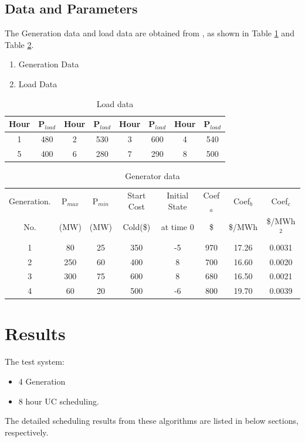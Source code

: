 \documentclass[a4paper, 12pt, notitlepage]{report}
\begin{document}
\section{Data and Parameters}
The Generation data and load data are obtained from \cite{4}, as shown in Table \ref{table:table1} and Table \ref{table:table2}.
\begin{enumerate}
\item[1)]Generation Data
\item[2)]Load Data
\end{enumerate}

\begin{table}
\centering
\begin{tabular}{ | c | c || c | c || c | c || c | c |}
\hline
Hour & P$_{load}$ & Hour & P$_{load}$  & Hour & P$_{load}$ & Hour & P$_{load}$\\
\hline
1 & 480  & 2 & 530 & 3 & 600 & 4 & 540\\
\hline
5 & 400  & 6 & 280 & 7 & 290 & 8 & 500\\
\hline
\end{tabular}
\caption{Load data}
\label{table:table1}
\end{table}

\begin{table}
\centering
\begin{tabular}{|c|c|c|c|c|c|c|c|}
\hline
Generation. & P$_{max}$ & P$_{min}$ & Start Cost & Initial State & Coef$_{a}$ & Coef$_{b}$  &  Coef$_{c}$  \\
No.         & (MW)    & (MW)       & Cold(\$)  & at time 0     &     \$     &  \$/MWh  & \$/MWh$^{2}$ \\
\hline
1 & 80  & 25 & 350 & -5 & 970 & 17.26 & 0.0031\\
\hline
2 & 250 & 60 & 400 & 8  & 700 & 16.60 & 0.0020\\
\hline
3 & 300 & 75 & 600 & 8  & 680 & 16.50 & 0.0021\\
\hline
4 & 60  & 20 & 500 & -6 & 800 & 19.70 & 0.0039\\
\hline
\end{tabular}
\caption{Generator data}
\label{table:table2}
\end{table}

\chapter{Results}
The test system:
\begin{itemize}
  \item 4 Generation
  \item 8 hour UC scheduling.
\end{itemize}
The detailed scheduling results from these algorithms are listed in below sections, respectively.
\end{document}
